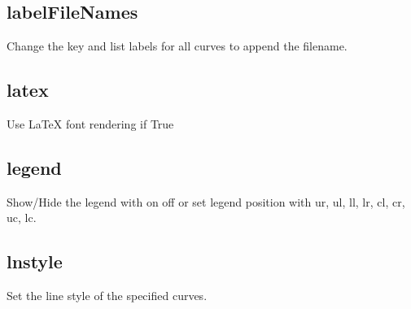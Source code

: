 \documentclass[letterpaper,10pt,english]{sphinxmanual}
\begin{document}
\subsection{labelFileNames}
\label{\detokenize{plot_control_cmds:labelfilenames}}
Change the key and list labels for all curves to append the filename.

\begin{sphinxVerbatim}[commandchars=\\\{\}]
\PYG{p}{[}\PYG{p}{]} 
\end{sphinxVerbatim}


\subsection{latex}
\label{\detokenize{plot_control_cmds:latex}}
Use LaTeX font rendering if True

\begin{sphinxVerbatim}[commandchars=\\\{\}]
\PYG{p}{[}\PYG{p}{]}    
\end{sphinxVerbatim}


\subsection{legend}
\label{\detokenize{plot_control_cmds:legend}}
Show/Hide the legend with on \textbar{} off or set legend position with ur, ul, ll, lr, cl, cr, uc, lc. 

\begin{sphinxVerbatim}[commandchars=\\\{\}]
\PYG{p}{[}\PYG{p}{]}     \PYG{p}{[}\PYG{p}{]}
\end{sphinxVerbatim}


\subsection{lnstyle}
\label{\detokenize{plot_control_cmds:lnstyle}}
Set the line style of the specified curves.

\begin{sphinxVerbatim}[commandchars=\\\{\}]
\PYG{p}{[}\PYG{p}{]}          
\end{sphinxVerbatim}
\end{document}
